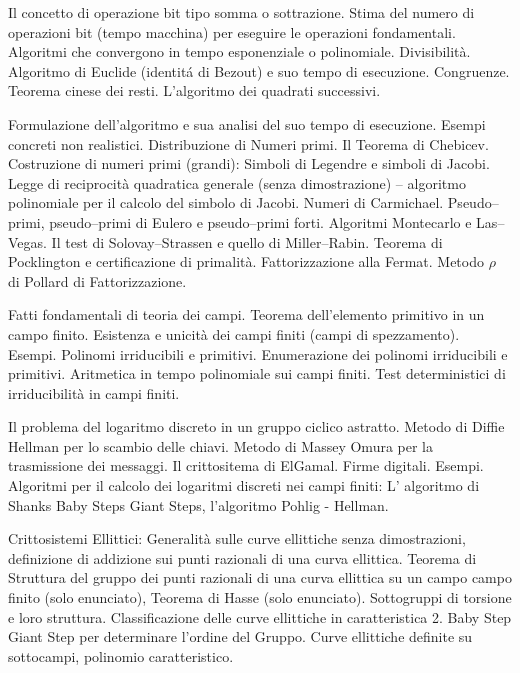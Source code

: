  
\def\abbrcorso{CR410}
\def\titolocorso{Crittografia I}
\def\sottotitolo{Crittografia a chiave pubblica}
\def\docente{Prof. Francesco Pappalardi} \def\crediti{7}
\def\semestre{II} 
\def\esoneri{1} 
\def\scrittofinale{1}
\def\oralefinale{1} 
\def\altreprove{0}

\Intestazione

Il concetto di operazione bit tipo somma o sottrazione. Stima del
numero di operazioni bit (tempo macchina) per eseguire le
operazioni fondamentali. Algoritmi che convergono in tempo
esponenziale o polinomiale. Divisibilit\`a. Algoritmo di Euclide
(identit\'a di Bezout) e suo tempo di esecuzione. Congruenze.
Teorema cinese dei resti. L'algoritmo dei quadrati successivi.

Formulazione dell'algoritmo e sua analisi  del suo tempo di esecuzione.
Esempi concreti non realistici. Distribuzione di Numeri primi. Il
Teorema di Chebicev. Costruzione di numeri primi (grandi): Simboli
di Legendre e simboli di Jacobi. Legge di reciprocit\`{a}
quadratica generale (senza dimostrazione) -- algoritmo polinomiale
per il calcolo del simbolo di Jacobi. Numeri di Carmichael.
Pseudo--primi, pseudo--primi di Eulero e pseudo--primi forti.
Algoritmi Montecarlo e Las--Vegas. Il test di Solovay--Strassen e
quello di Miller--Rabin. Teorema di Pocklington e certificazione
di primalit\`{a}. Fattorizzazione alla Fermat. Metodo $\rho$ di Pollard
di Fattorizzazione.

 Fatti fondamentali di teoria dei
campi. Teorema dell'elemento primitivo in un campo finito.
Esistenza e unicit\`a dei campi finiti (campi di spezzamento).
Esempi. Polinomi irriducibili e primitivi. Enumerazione dei
polinomi irriducibili e primitivi. Aritmetica in tempo polinomiale
sui campi finiti. Test deterministici di irriducibilit\`{a} in
campi finiti.

 Il problema del logaritmo
discreto in un gruppo ciclico astratto. Metodo di Diffie Hellman
per lo scambio delle chiavi. Metodo di Massey Omura per la
trasmissione dei messaggi. Il crittositema di ElGamal. Firme
digitali. Esempi. Algoritmi per il calcolo dei
logaritmi discreti nei campi finiti: L' algoritmo di Shanks
Baby Steps Giant Steps, l'algoritmo Pohlig - Hellman.

Crittosistemi Ellittici: Generalit\`{a} sulle curve ellittiche senza
dimostrazioni,
definizione di addizione sui punti razionali di una curva
ellittica. Teorema di Struttura del
gruppo dei punti razionali di una curva ellittica su un campo campo
finito (solo enunciato), Teorema di Hasse (solo enunciato). Sottogruppi
di torsione e loro struttura. Classificazione 
delle curve ellittiche in caratteristica 2. Baby Step Giant Step per determinare
l'ordine del Gruppo. Curve ellittiche definite su sottocampi, polinomio caratteristico.


